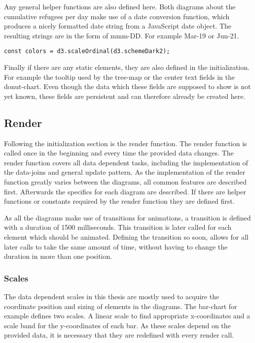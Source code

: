 Any general helper functions are also defined here. Both diagrams about the cumulative refugees per day make use of a date conversion function, which produces a nicely formatted date string from a JavaScript date object. The resulting strings are in the form of mmm-DD. For example Mar-19 or Jun-21.

\begin{minipage}{\linewidth}
\begin{lstlisting}[style=htmlcssjs, caption={Definition of the data independent color scale. \texttt{d3.schemeDarkv2} is a predefined list of color values which is to be used by the scale.}, label={color_scale}]
const colors = d3.scaleOrdinal(d3.schemeDark2);
\end{lstlisting}
\end{minipage}

Finally if there are any static elements, they are also defined in the initialization. For example the tooltip used by the tree-map or the center text fields in the donut-chart. Even though the data which these fields are supposed to show is not yet known, these fields are persistent and can therefore already be created here.

\subsection{Render}
Following the initialization section is the render function. The render function is called once in the beginning and every time the provided data changes. The render function covers all data dependent tasks, including the implementation of the data-joins and general update pattern. As the implementation of the render function greatly varies between the diagrams, all common features are described first. Afterwards the specifics for each diagram are described. If there are helper functions or constants required by the render function they are defined first. 

As all the diagrams make use of transitions for animations, a transition is defined with a duration of 1500 milliseconds. This transition is later called for each element which should be animated. Defining the transition so soon, allows for all later calls to take the same amount of time, without having to change the duration in more than one position.

\subsubsection{Scales}
The data dependent scales in this thesis are mostly used to acquire the coordinate position and sizing of elements in the diagrams.  The bar-chart for example defines two scales. A linear scale to find appropriate x-coordinates and a scale band for the y-coordinates of each bar. As these scales depend on the provided data, it is necessary that they are redefined with every render call.


